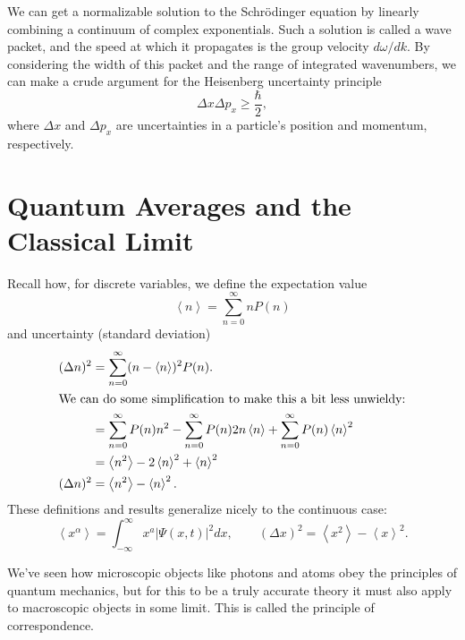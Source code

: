 \documentclass[../p052main.tex]{subfiles}
\begin{document}
\begin{summary}
    We can get a normalizable solution to the Schrödinger equation by linearly combining a continuum of complex exponentials.
    Such a solution is called a wave packet, and the speed at which it propagates is the group velocity $d \omega / dk$.
    By considering the width of this packet and the range of integrated wavenumbers, we can make a crude argument for the Heisenberg uncertainty principle
    \[ \Delta x \Delta p_x \geq \frac{\hbar}{2}, \]
    where $\Delta x$ and $\Delta p_x$ are uncertainties in a particle's position and momentum, respectively.
\end{summary}

\section{Quantum Averages and the Classical Limit}
Recall how, for discrete variables, we define the expectation value
\[ \left< n \right> = \sum_{n=0}^{\infty} nP(n) \]
and uncertainty (standard deviation)
\begin{align*}
    (\Delta n)^2 &= \sum_{n=0}^{\infty} (n - \left< n \right>)^2P(n). \\
    \intertext{We can do some simplification to make this a bit less unwieldy:}
    &= \sum_{n=0}^{\infty} P(n) n^2 - \sum_{n=0}^{\infty} P(n) 2n\left< n \right> + \sum_{n=0}^{\infty}P(n) \left< n \right>^2 \\
    &= \left< n^2 \right> - 2\left< n \right>^2 + \left< n \right>^2 \\
    (\Delta n)^2 &= \left< n^2 \right> - \left< n \right>^2.
\end{align*}
These definitions and results generalize nicely to the continuous case:
\[ \left< x^{\alpha} \right> = \int_{-\infty}^{\infty} x^{a} |\Psi(x,t)|^2 dx, \qquad (\Delta x)^2 = \left< x^2 \right> - \left< x \right>^2. \]

We've seen how microscopic objects like photons and atoms obey the principles of quantum mechanics, but for this to be a truly accurate theory it must also apply to macroscopic objects in some limit.
This is called the principle of correspondence.
\end{document}

